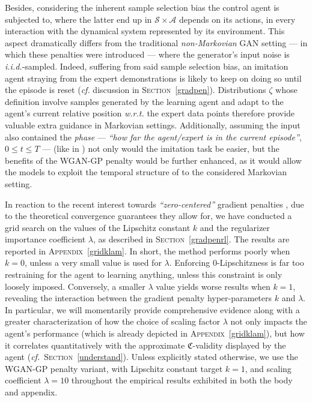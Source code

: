 Besides, considering the inherent sample selection bias \cite{Heckman1979-ui} the control agent
is subjected to, where the latter end up in $\mathcal{S} \times \mathcal{A}$ depends on
its actions, in every interaction with the dynamical system represented by its environment.
This aspect dramatically differs from the traditional \emph{non-Markovian} GAN setting ---
in which these penalties were introduced ---
where the generator's input noise is \textit{i.i.d.}-sampled.
Indeed, suffering from said sample selection bias,
an imitation agent straying from the expert demonstrations is likely to
keep on doing so until the episode is reset
(\textit{cf.} discussion in \textsc{Section}~\ref{gradpen}).
Distributions $\zeta$ whose definition involve samples generated by
the learning agent and adapt to the agent's current relative position \textit{w.r.t.}
the expert data points therefore provide valuable extra guidance
in Markovian settings.
Additionally, assuming the input also contained the \emph{phase}
--- \textit{``how far the agent/expert is in the current episode''}, $0 \leq t \leq T$ ---
(like in \cite{Peng2018-mo})
not only would the imitation task be easier,
but the benefits of the WGAN-GP penalty would be further enhanced,
as it would allow the models to exploit the temporal structure
of to the considered Markovian setting.

In reaction to the recent interest towards \textit{``zero-centered''} gradient penalties
\cite{Roth2017-sj, Mescheder2018-ck},
due to the theoretical convergence guarantees they allow for,
we have conducted a grid search on the values of
the Lipschitz constant $k$ and the regularizer importance coefficient $\lambda$,
as described in \textsc{Section}~\ref{gradpenrl}.
The results are reported in \textsc{Appendix}~\ref{gridklam}.
In short, the method performs poorly when $k=0$,
unless a very small value is used for $\lambda$.
Enforcing $0$-Lipschitzness is far too restraining for the agent to learning
anything, unless this constraint is only loosely imposed.
Conversely, a smaller $\lambda$ value yields worse results when $k=1$,
revealing the interaction between the gradient penalty hyper-parameters $k$ and $\lambda$.
In particular, we will momentarily provide comprehensive evidence along with a greater characterization
of how the choice of scaling factor $\lambda$ not only impacts the agent's performance (which is
already depicted in \textsc{Appendix}~\ref{gridklam}), but how it correlates quantitatively with
the approximate
$\mathfrak{C}$-validity displayed by the agent (\textit{cf.}~\textsc{Section}~\ref{understand}).
Unless explicitly stated otherwise, we use the WGAN-GP penalty variant, with Lipschitz constant target $k=1$,
and scaling coefficient $\lambda=10$ throughout the empirical results exhibited in both the body and appendix.

